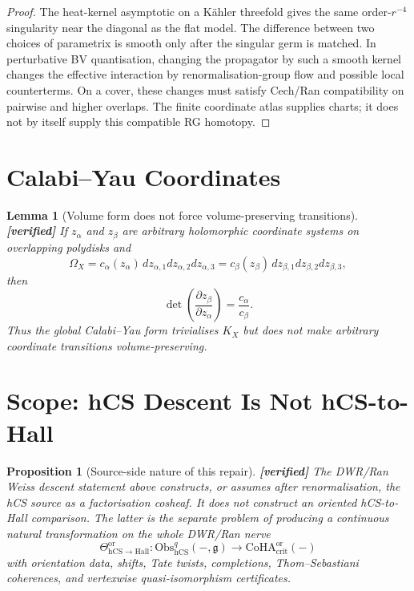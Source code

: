 \documentclass[11pt]{article}
\newtheorem{proposition}[theorem]{Proposition}
\newtheorem{lemma}[theorem]{Lemma}
\theoremstyle{definition}
\providecommand{\ClaimStatusVerified}{\textbf{[verified]}}
\providecommand{\Obs}{\mathrm{Obs}}
\providecommand{\hCS}{\mathrm{hCS}}
\providecommand{\frakg}{\mathfrak{g}}
\providecommand{\Hall}{\mathrm{Hall}}
\providecommand{\CoHA}{\mathrm{CoHA}}
\begin{document}
\begin{proof}
The heat-kernel asymptotic on a K\"ahler threefold gives the same
order-$r^{-4}$ singularity near the diagonal as the flat model. The
difference between two choices of parametrix is smooth only after the
singular germ is matched. In perturbative BV quantisation, changing the
propagator by such a smooth kernel changes the effective interaction by
renormalisation-group flow and possible local counterterms. On a cover,
these changes must satisfy Cech/Ran compatibility on pairwise and
higher overlaps. The finite coordinate atlas supplies charts; it does
not by itself supply this compatible RG homotopy.
\end{proof}

\section{Calabi--Yau Coordinates}
\label{sec:cy-coordinates}

\begin{lemma}[Volume form does not force volume-preserving transitions]
\label{lem:volume-transitions}
\ClaimStatusVerified{}
If $z_\alpha$ and $z_\beta$ are arbitrary holomorphic coordinate
systems on overlapping polydisks and
\[
 \Omega_X=c_\alpha(z_\alpha)\,dz_{\alpha,1}dz_{\alpha,2}dz_{\alpha,3}
 =c_\beta(z_\beta)\,dz_{\beta,1}dz_{\beta,2}dz_{\beta,3},
\]
then
\[
 \det\!\left(\frac{\partial z_\beta}{\partial z_\alpha}\right)
 =\frac{c_\alpha}{c_\beta}.
\]
Thus the global Calabi--Yau form trivialises $K_X$ but does not make
arbitrary coordinate transitions volume-preserving.
\end{lemma}

\section{Scope: hCS Descent Is Not hCS-to-Hall}
\label{sec:scope}

\begin{proposition}[Source-side nature of this repair]
\label{prop:source-side-only}
\ClaimStatusVerified{}
The DWR/Ran Weiss descent statement above constructs, or assumes after
renormalisation, the hCS source as a factorisation cosheaf. It does not
construct an oriented hCS-to-Hall comparison. The latter is the separate
problem of producing a continuous natural transformation on the whole
DWR/Ran nerve
\[
 \Theta_{\hCS\to\Hall}^{\mathrm{or}}:
 \Obs_{\hCS}^{q}(-,\frakg)
 \longrightarrow
 \CoHA_{\mathrm{crit}}^{\mathrm{or}}(-)
\]
with orientation data, shifts, Tate twists, completions,
Thom--Sebastiani coherences, and vertexwise quasi-isomorphism
certificates.
\end{proposition}
\end{document}
